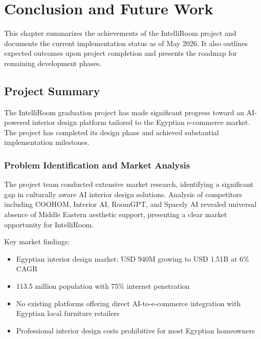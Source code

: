 
\chapter{Conclusion and Future Work}
\label{chap:conclusion}

This chapter summarizes the achievements of the IntelliRoom project and documents the current implementation status as of May 2026. It also outlines expected outcomes upon project completion and presents the roadmap for remaining development phases.

\section{Project Summary}
\label{sec:summary}

The IntelliRoom graduation project has made significant progress toward an AI-powered interior design platform tailored to the Egyptian e-commerce market. The project has completed its design phase and achieved substantial implementation milestones.

\subsection{Problem Identification and Market Analysis}

The project team conducted extensive market research, identifying a significant gap in culturally aware AI interior design solutions. Analysis of competitors including COOHOM, Interior AI, RoomGPT, and Spacely AI revealed universal absence of Middle Eastern aesthetic support, presenting a clear market opportunity for IntelliRoom.

Key market findings:
\begin{itemize}
    \item Egyptian interior design market: USD 940M growing to USD 1.51B at 6\% CAGR
    \item 113.5 million population with 75\% internet penetration
    \item No existing platforms offering direct AI-to-e-commerce integration with Egyptian local furniture retailers
    \item Professional interior design costs prohibitive for most Egyptian homeowners
\end{itemize}


